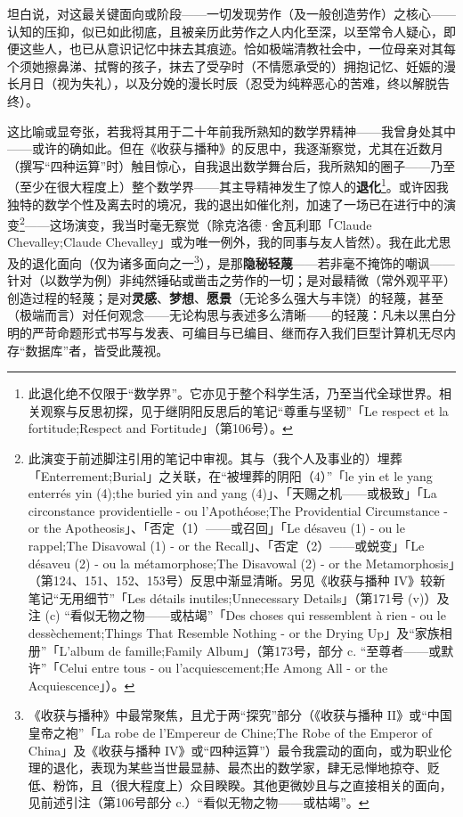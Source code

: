 坦白说，对这最关键面向或阶段——一切发现劳作（及一般创造劳作）之核心——认知的压抑，似已如此彻底，且被亲历此劳作之人内化至深，以至常令人疑心，即便这些人，也已从意识记忆中抹去其痕迹。恰如极端清教社会中，一位母亲对其每个须她擦鼻涕、拭臀的孩子，抹去了受孕时（不情愿承受的）拥抱记忆、妊娠的漫长月日（视为失礼），以及分娩的漫长时辰（忍受为纯粹恶心的苦难，终以解脱告终）。

这比喻或显夸张，若我将其用于二十年前我所熟知的数学界精神——我曾身处其中——或许的确如此。但在《收获与播种》的反思中，我逐渐察觉，尤其在近数月（撰写“四种运算”时）触目惊心，自我退出数学舞台后，我所熟知的圈子——乃至（至少在很大程度上）整个数学界——其主导精神发生了惊人的\textbf{退化}\footnote{此退化绝不仅限于“数学界”。它亦见于整个科学生活，乃至当代全球世界。相关观察与反思初探，见于继阴阳反思后的笔记“尊重与坚韧”「Le respect et la fortitude;Respect and Fortitude」（第106号）。}。或许因我独特的数学个性及离去时的境况，我的退出如催化剂，加速了一场已在进行中的演变\footnote{此演变于前述脚注引用的笔记中审视。其与（我个人及事业的）埋葬「Enterrement;Burial」之关联，在“被埋葬的阴阳（4）”「le yin et le yang enterrés yin (4);the buried yin and yang (4)」、「天赐之机——或极致」「La circonstance providentielle - ou l'Apothéose;The Providential Circumstance - or the Apotheosis」、「否定（1）——或召回」「Le désaveu (1) - ou le rappel;The Disavowal (1) - or the Recall」、「否定（2）——或蜕变」「Le désaveu (2) - ou la métamorphose;The Disavowal (2) - or the Metamorphosis」（第124、151、152、153号）反思中渐显清晰。另见《收获与播种 IV》较新笔记“无用细节”「Les détails inutiles;Unnecessary Details」（第171号 (v)）及注 (c) “看似无物之物——或枯竭”「Des choses qui ressemblent à rien - ou le dessèchement;Things That Resemble Nothing - or the Drying Up」及“家族相册”「L'album de famille;Family Album」（第173号，部分 c. “至尊者——或默许”「Celui entre tous - ou l'acquiescement;He Among All - or the Acquiescence」）。}——这场演变，我当时毫无察觉（除克洛德·舍瓦利耶「Claude Chevalley;Claude Chevalley」或为唯一例外，我的同事与友人皆然）。我在此尤思及的退化面向（仅为诸多面向之一\footnote{《收获与播种》中最常聚焦，且尤于两“探究”部分（《收获与播种 II》或“中国皇帝之袍”「La robe de l'Empereur de Chine;The Robe of the Emperor of China」及《收获与播种 IV》或“四种运算”）最令我震动的面向，或为职业伦理的退化，表现为某些当世最显赫、最杰出的数学家，肆无忌惮地掠夺、贬低、粉饰，且（很大程度上）众目睽睽。其他更微妙且与之直接相关的面向，见前述引注（第106号部分 c.）“看似无物之物——或枯竭”。}），是那\textbf{隐秘轻蔑}——若非毫不掩饰的嘲讽——针对（以数学为例）非纯然锤砧或凿击之劳作的一切；是对最精微（常外观平平）创造过程的轻蔑；是对\textbf{灵感}、\textbf{梦想}、\textbf{愿景}（无论多么强大与丰饶）的轻蔑，甚至（极端而言）对任何观念——无论构思与表述多么清晰——的轻蔑：凡未以黑白分明的严苛命题形式书写与发表、可编目与已编目、继而存入我们巨型计算机无尽内存“数据库”者，皆受此蔑视。

